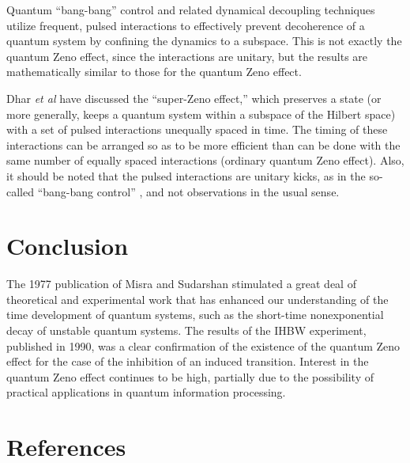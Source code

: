 \documentclass[12pt]{article}
\begin{document}
Quantum ``bang-bang'' control and related dynamical decoupling
techniques \cite{viola98,viola99} utilize frequent, pulsed
interactions to effectively prevent decoherence of a quantum system
by confining the dynamics to a subspace.  This is not exactly the
quantum Zeno effect, since the interactions are unitary, but the
results are mathematically similar to those for the quantum Zeno
effect.

Dhar {\em et al} \cite{dhar06} have discussed the ``super-Zeno
effect,'' which preserves a state (or more generally, keeps a
quantum system within a subspace of the Hilbert space) with a set of
pulsed interactions unequally spaced in time.  The timing of these
interactions can be arranged so as to be more efficient than can be
done with the same number of equally spaced interactions (ordinary
quantum Zeno effect).  Also, it should be noted that the pulsed
interactions are unitary kicks, as in the so-called ``bang-bang
control'' \cite{viola98}, and not observations in the usual sense.


\section{Conclusion}

The 1977 publication of Misra and Sudarshan stimulated a great deal
of theoretical and experimental work that has enhanced our
understanding of the time development of quantum systems, such as
the short-time nonexponential decay of unstable quantum systems. The
results of the IHBW experiment, published in 1990, was a clear
confirmation of the existence of the quantum Zeno effect for the
case of the inhibition of an induced transition.  Interest in the
quantum Zeno effect continues to be high, partially due to the
possibility of practical applications in quantum information
processing.



\section*{References}
\end{document}
